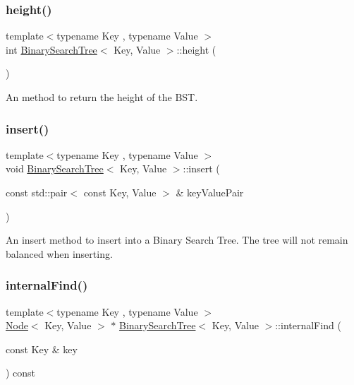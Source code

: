 \subsubsection{\texorpdfstring{height()}{height()}}
{\footnotesize\ttfamily template$<$typename Key , typename Value $>$ \\
int \mbox{\hyperlink{classBinarySearchTree}{Binary\+Search\+Tree}}$<$ Key, Value $>$\+::height (\begin{DoxyParamCaption}{ }\end{DoxyParamCaption})}

An method to return the height of the B\+ST. \mbox{\label{classBinarySearchTree_a20c129156570a782fe10b1d803928a4c}} 
\subsubsection{\texorpdfstring{insert()}{insert()}}
{\footnotesize\ttfamily template$<$typename Key , typename Value $>$ \\
void \mbox{\hyperlink{classBinarySearchTree}{Binary\+Search\+Tree}}$<$ Key, Value $>$\+::insert (\begin{DoxyParamCaption}\item[{const std\+::pair$<$ const Key, Value $>$ \&}]{key\+Value\+Pair }\end{DoxyParamCaption})\hspace{0.3cm}{\ttfamily [virtual]}}

An insert method to insert into a Binary Search Tree. The tree will not remain balanced when inserting. \mbox{\label{classBinarySearchTree_aed5147cde1f6bb15aa192456b7a1f20c}} 
\subsubsection{\texorpdfstring{internal\+Find()}{internalFind()}}
{\footnotesize\ttfamily template$<$typename Key , typename Value $>$ \\
\mbox{\hyperlink{classNode}{Node}}$<$ Key, Value $>$ $\ast$ \mbox{\hyperlink{classBinarySearchTree}{Binary\+Search\+Tree}}$<$ Key, Value $>$\+::internal\+Find (\begin{DoxyParamCaption}\item[{const Key \&}]{key }\end{DoxyParamCaption}) const\hspace{0.3cm}{\ttfamily [protected]}}

